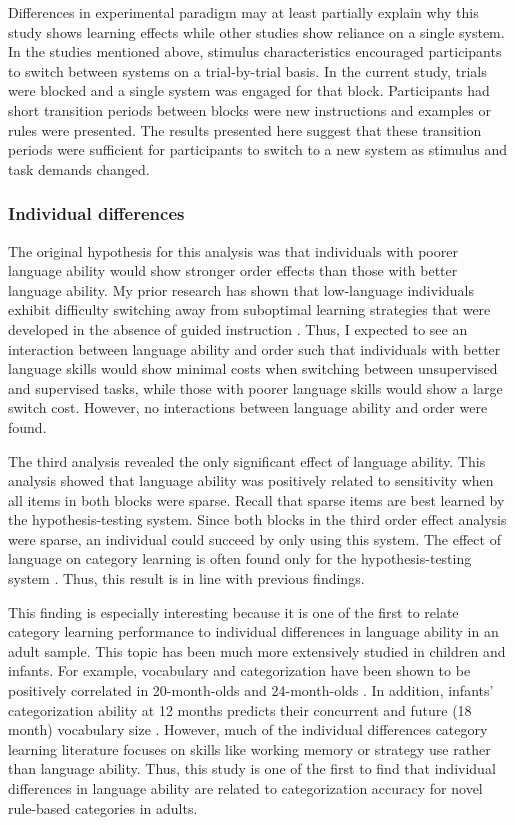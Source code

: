 \documentclass[../dissertation.tex]{subfiles}
\begin{document}
	Differences in experimental paradigm may at least partially explain why this study shows learning effects while other studies show reliance on a single system. In the studies mentioned above, stimulus characteristics encouraged participants to switch between systems on a trial-by-trial basis. In the current study, trials were blocked and a single system was engaged for that block. Participants had short transition periods between blocks were new instructions and examples or rules were presented. The results presented here suggest that these transition periods were sufficient for participants to switch to a new system as stimulus and task demands changed. 
	
\subsubsection{Individual differences}

	The original hypothesis for this analysis was that individuals with poorer language ability would show stronger order effects than those with better language ability. My prior research has shown that low-language individuals exhibit difficulty switching away from suboptimal learning strategies that were developed in the absence of guided instruction \citep{Ryherd2019}. Thus, I expected to see an interaction between language ability and order such that individuals with better language skills would show minimal costs when switching between unsupervised and supervised tasks, while those with poorer language skills would show a large switch cost. However, no interactions between language ability and order were found. \par
	The third analysis revealed the only significant effect of language ability. This analysis showed that language ability was positively related to sensitivity when all items in both blocks were sparse. Recall that sparse items are best learned by the hypothesis-testing system. Since both blocks in the third order effect analysis were sparse, an individual could succeed by only using this system. The effect of language on category learning is often found only for the hypothesis-testing system \citep{Lupyan2009,Lupyan2013}. Thus, this result is in line with previous findings. \par 
	This finding is especially interesting because it is one of the first to relate category learning performance to individual differences in language ability in an adult sample. This topic has been much more extensively studied in children and infants. For example, vocabulary and  categorization have been shown to be positively correlated in 20-month-olds \citep{Nazzi2001} and 24-month-olds \citep{Jaswal2007}. In addition, infants' categorization ability at 12 months predicts their concurrent and future (18 month) vocabulary size \citep{Ferguson2015}. However, much of the individual differences category learning literature focuses on skills like working memory or strategy use rather than language ability. Thus, this study is one of the first to find that individual differences in language ability are related to categorization accuracy for novel rule-based categories in adults.
	
\end{document}
